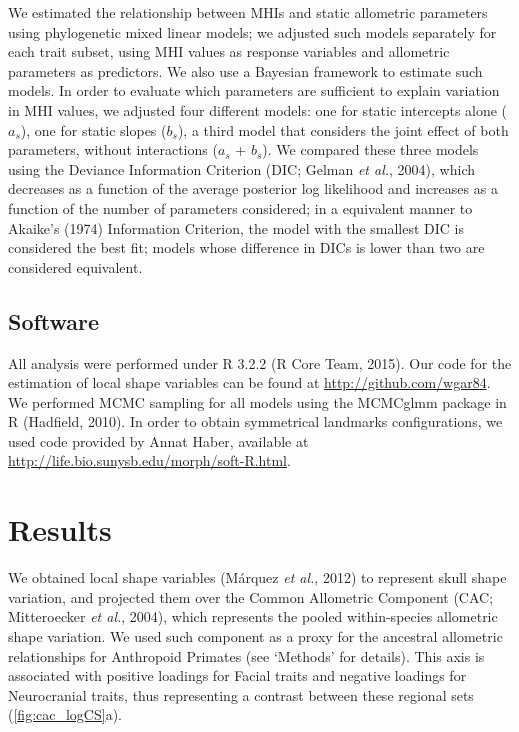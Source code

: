 \documentclass[12pt,twoside]{report}
\begin{document}
We estimated the relationship between MHIs and static allometric
parameters using phylogenetic mixed linear models; we adjusted such
models separately for each trait subset, using MHI values as response
variables and allometric parameters as predictors. We also use a
Bayesian framework to estimate such models. In order to evaluate which
parameters are sufficient to explain variation in MHI values, we
adjusted four different models: one for static intercepts alone ($a_s$),
one for static slopes ($b_s$), a third model that considers the joint
effect of both parameters, without interactions ($a_s$ + $b_s$). We
compared these three models using the Deviance Information Criterion
(DIC; Gelman \emph{et al.}, 2004), which decreases as a function of the
average posterior log likelihood and increases as a function of the
number of parameters considered; in a equivalent manner to Akaike's
(1974) Information Criterion, the model with the smallest DIC is
considered the best fit; models whose difference in DICs is lower than
two are considered equivalent.

\subsection{Software}\label{software-1}

All analysis were performed under R 3.2.2 (R Core Team, 2015). Our code
for the estimation of local shape variables can be found at
\url{http://github.com/wgar84}. We performed MCMC sampling for all
models using the MCMCglmm package in R (Hadfield, 2010). In order to
obtain symmetrical landmarks configurations, we used code provided by
Annat Haber, available at
\url{http://life.bio.sunysb.edu/morph/soft-R.html}.

\section{Results}\label{results-1}

We obtained local shape variables (Márquez \emph{et al.}, 2012) to
represent skull shape variation, and projected them over the Common
Allometric Component (CAC; Mitteroecker \emph{et al.}, 2004), which
represents the pooled within-species allometric shape variation. We used
such component as a proxy for the ancestral allometric relationships for
Anthropoid Primates (see `Methods' for details). This axis is associated
with positive loadings for Facial traits and negative loadings for
Neurocranial traits, thus representing a contrast between these regional
sets (\autoref{fig:cac_logCS}a).
\end{document}
